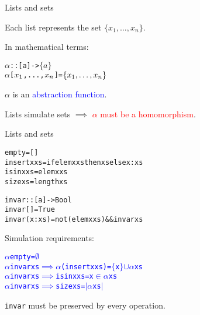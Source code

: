 \documentclass{beamer}
\def\code#1{\texttt{\frenchspacing#1}}
\begin{document}
\begin{frame}[fragile]{Lists and sets}

Each list \code{[$x_1$, ..., $x_n$]} represents the set $\{x_1, \dots, x_n\}$.

\pause

In mathematical terms:
\begin{alltt}
\(\alpha\) :: [a] -> \(\{a\}\)
\(\alpha\) [\(x\sb{1}\), ..., \(x\sb{n}\)]  = \(\{x\sb{1}, \dots, x\sb{n}\}\)
\end{alltt}

$\alpha$ is an \textcolor{blue}{abstraction function}.

\pause

\vspace{1cm}
Lists simulate sets $\implies$ \textcolor{red}{$\alpha$ must be a homomorphism}.

\end{frame}

\begin{frame}[fragile]{Lists and sets}

\begin{alltt}
empty = []
insert x xs = if elem x xs then xs else x:xs
isin x xs = elem x xs
size xs = length xs\pause

invar :: [a] -> Bool\pause
invar []     = True\pause
invar (x:xs) = not (elem x xs) && invar xs
\end{alltt}

Simulation requirements:\pause
\begin{alltt}
                 \textcolor{blue}{\(\alpha\) empty = \(\emptyset\)}\pause
\textcolor{blue}{\(\alpha\) invar xs \(\implies\) \(\alpha\) (insert x xs) = \(\{\)x\(\}\) \(\cup\) \(\alpha\) xs}\pause
\textcolor{blue}{\(\alpha\) invar xs \(\implies\) isin x xs = x \(\in\) \(\alpha\) xs}\pause
\textcolor{blue}{\(\alpha\) invar xs \(\implies\) size xs = \(\lvert\)\(\alpha\) xs\(\rvert\)}
\end{alltt}

\pause

\begin{alertblock}{\centering \code{invar} must be preserved by every operation.}
\end{alertblock}

\end{frame}
\end{document}
